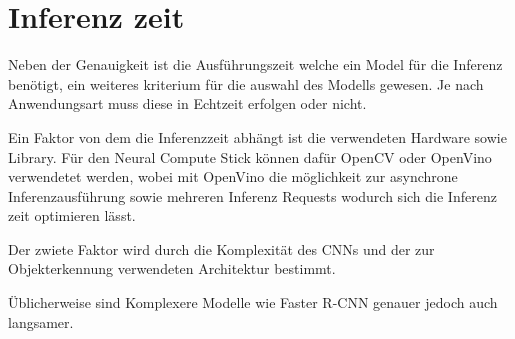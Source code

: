 






\section{Inferenz zeit}\label{sec:infertime}

Neben der Genauigkeit ist die Ausführungszeit welche ein Model für die 
Inferenz benötigt, ein weiteres kriterium für die auswahl des Modells gewesen.
Je nach Anwendungsart muss diese in Echtzeit erfolgen oder nicht.

Ein Faktor von dem die Inferenzzeit abhängt ist die verwendeten Hardware
sowie Library. Für den Neural Compute Stick können dafür OpenCV oder 
OpenVino verwendetet werden, wobei mit OpenVino die möglichkeit 
zur asynchrone Inferenzausführung sowie mehreren Inferenz Requests wodurch 
sich die Inferenz zeit optimieren lässt.


Der zwiete Faktor wird durch die Komplexität des CNNs und der
zur Objekterkennung verwendeten Architektur bestimmt.

Üblicherweise sind Komplexere Modelle wie Faster R-CNN genauer jedoch 
auch langsamer.

